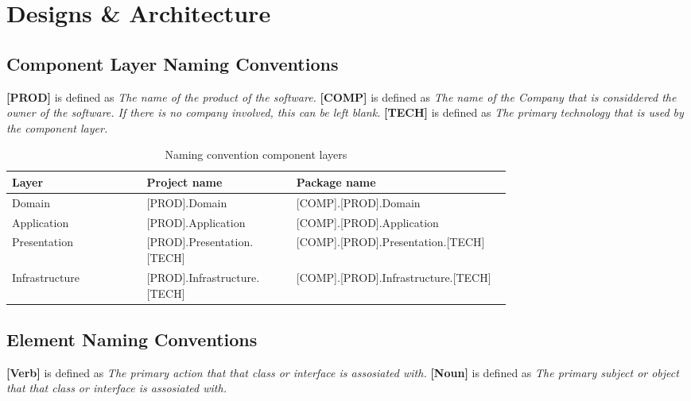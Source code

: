 \chapter{Designs \& Architecture} \label{appendix_designs} 

\section{Component Layer Naming Conventions} \label{appendix_component_naming_convention}

\textbf{[PROD]} is defined as \textit{The name of the product of the software.} \newline 
\textbf{[COMP]} is defined as \textit{The name of the Company that is considdered the owner of the software. If
there is no company involved, this can be left blank.} \newline 
\textbf{[TECH]} is defined as \textit{The primary technology that is used by the component layer.} 

\begin{table}[H]
    \footnotesize
    \begin{tabular}{ l p{0.30\linewidth} p{0.43\linewidth} }
    \hline
    \textbf{Layer} & \textbf{Project name} & \textbf{Package name} \\ 
    \hline
    Domain & [PROD].Domain & [COMP].[PROD].Domain \\
    Application & [PROD].Application & [COMP].[PROD].Application \\
    Presentation & [PROD].Presentation.[TECH] & [COMP].[PROD].Presentation.[TECH] \\
    Infrastructure & [PROD].Infrastructure.[TECH] & [COMP].[PROD].Infrastructure.[TECH]
    \\ \hline
    \end{tabular}
\caption{Naming convention component layers}
\label{table:component_naming_convention}
\end{table}

\section{Element Naming Conventions} \label{appendix_element_naming_convention}

\textbf{[Verb]} is defined as \textit{The primary action that that class or interface is assosiated with.} \newline 
\textbf{[Noun]} is defined as \textit{The primary subject or object that that class or interface is assosiated with.} 

